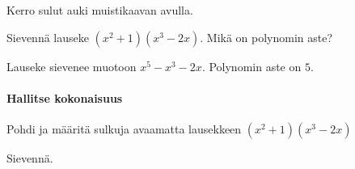 \begin{tehtavasivu}
\begin{tehtava}
    Kerro sulut auki muistikaavan avulla.
    \begin{alakohdat}
    \end{alakohdat}
    \begin{vastaus}
        \begin{alakohdat}
        \end{alakohdat}
    \end{vastaus}
\end{tehtava}

\begin{tehtava}
    Sievennä lauseke $(x^2+1)(x^3-2x)$. Mikä on polynomin aste?
    \begin{vastaus}
        Lauseke sievenee muotoon $x^5-x^3-2x$. Polynomin aste on $5$.
    \end{vastaus}
\end{tehtava}

\paragraph*{Hallitse kokonaisuus}

\begin{tehtava}
    Pohdi ja määritä sulkuja avaamatta lausekkeen $(x^2+1)(x^3-2x)$
    \begin{alakohdat}
    \end{alakohdat}
    \begin{vastaus}
        \begin{alakohdat}
        \end{alakohdat}
    \end{vastaus}
\end{tehtava}

\begin{tehtava}
    Sievennä.
    \begin{alakohdat}
    \end{alakohdat}
    \begin{vastaus}
        \begin{alakohdat}
        \end{alakohdat}
    \end{vastaus}
\end{tehtava}


\end{tehtavasivu}

